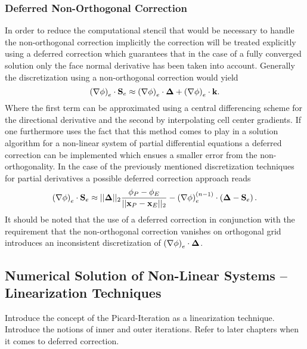       \subsubsection{Deferred Non-Orthogonal Correction}

      In order to reduce the computational stencil that would be necessary to handle the non-orthogonal correction implicitly the correction will be treated explicitly using a deferred correction which guarantees that in the case of a fully converged solution only the face normal derivative has been taken into account. Generally the discretization using a non-orthogonal correction would yield 
      \begin{displaymath}
        \left( \nabla \phi \right)_e \cdot \mathbf{S}_e \approx \left(\nabla \phi \right)_e \cdot \boldsymbol{\Delta} + \left( \nabla \phi \right)_e \cdot \mathbf{k}.
      \end{displaymath}
      Where the first term can be approximated using a central differencing scheme for the directional derivative and the second by interpolating cell center gradients. If one furthermore uses the fact that this method comes to play in a solution algorithm for a non-linear system of partial differential equations a deferred correction can be implemented which ensues a smaller error from the non-orthogonality. In the case of the previously mentioned discretization techniques for partial derivatives a possible deferred correction approach reads
      \begin{displaymath}
        \left( \nabla \phi \right)_e \cdot \mathbf{S}_e \approx ||\boldsymbol{\Delta}||_2 \frac{\phi_P - \phi_E}{||\mathbf{x}_P - \mathbf{x}_E||_2} - \left(\nabla \phi \right)_e^{(n-1)} \cdot \left(\boldsymbol{\Delta} - \mathbf{S}_e \right).
      \end{displaymath}
      It should be noted that the use of a deferred correction in conjunction with the requirement that the non-orthogonal correction vanishes on orthogonal grid introduces an inconsistent discretization of \( \left(\nabla \phi \right)_e \cdot \boldsymbol{\Delta} \).

    \subsection{Numerical Solution of Non-Linear Systems -- Linearization Techniques}
    \label{sec:nonlinear}

      Introduce the concept of the Picard-Iteration as a linearization technique. Introduce the notions of inner and outer iterations. Refer to later chapters when it comes to deferred correction.


